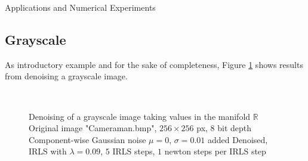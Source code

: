 \begin{chapter}{Applications and Numerical Experiments}
\subsection{Grayscale} %
As introductory example and for the sake of completeness, Figure \ref{fig:application_gray} shows results from denoising a grayscale image.
\label{sub:Grayscale}
\begin{figure}[h!]
    \centering
    \\
    \caption[Color image "Cameraman" grayscale denoising]{Denoising of a grayscale image taking values in the manifold $\mathbb{R}$
	 Original image "Cameraman.bmp", $256\times 256$ px, 8 bit depth
	 Component-wise Gaussian noise $\mu=0$, $\sigma=0.01$ added
	 Denoised, IRLS with $\lambda=0.09$, $5$ IRLS steps, $1$ newton steps per IRLS step
	\label{fig:application_gray}
    }
\end{figure}


\end{chapter}
